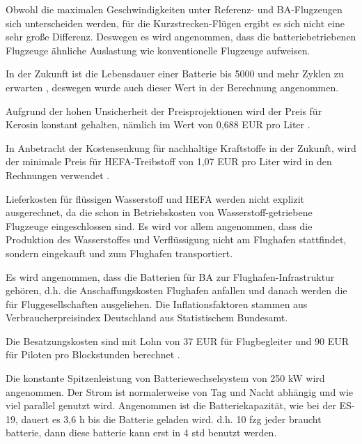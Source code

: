 Obwohl die maximalen Geschwindigkeiten unter Referenz- und BA-Flugzeugen sich unterscheiden werden, 
für die Kurzstrecken-Flügen ergibt es sich nicht eine sehr große Differenz.
Deswegen es wird angenommen, dass die batteriebetriebenen Flugzeuge ähnliche Auslastung wie konventionelle Flugzeuge aufweisen.

In der Zukunft ist die Lebensdauer einer Batterie bis 5000 und mehr Zyklen zu erwarten \cite{reimers2018introduction}, deswegen wurde auch dieser
Wert in der Berechnung angenommen.

Aufgrund der hohen Unsicherheit der Preisprojektionen wird der Preis für Kerosin konstant gehalten, nämlich im Wert von
0,688 EUR pro Liter \cite{iata_industry_statistics_2024}. 


In Anbetracht der Kostensenkung für nachhaltige Kraftstoffe in der Zukunft, wird der minimale Preis für HEFA-Treibstoff 
von 1,07 EUR pro Liter wird in den Rechnungen verwendet \cite{watson2024sustainable}.

Lieferkosten für flüssigen Wasserstoff und HEFA werden nicht explizit ausgerechnet,
da die schon in Betriebskosten von Wasserstoff-getriebene Flugzeuge eingeschlossen sind. Es wird vor allem angenommen, dass die Produktion 
des Wasserstoffes und Verflüssigung nicht am Flughafen stattfindet, sondern eingekauft und zum Flughafen transportiert.

Es wird angenommen, dass die Batterien für BA zur Flughafen-Infrastruktur gehören, 
d.h. die Anschaffungskosten Flughafen anfallen und danach werden die für Fluggesellschaften ausgeliehen.
Die Inflationsfaktoren stammen aus Verbraucherpreisindex Deutschland aus Statistischem Bundesamt.

Die Besatzungskosten sind mit Lohn von 37 EUR für Flugbegleiter und 90 EUR für Piloten pro Blockstunden berechnet \cite{discover_airlines_cabin}.

Die konstante Spitzenleistung von Batteriewechselsystem von 250 kW wird angenommen. Der Strom ist normalerweise von Tag und Nacht abhängig
und wie viel parallel genutzt wird. Angenommen ist die Batteriekapazität, wie bei der ES-19, dauert es 3,6 h bis die Batterie geladen wird.
d.h. 10 fzg jeder braucht batterie, dann diese batterie kann erst in 4 std benutzt werden.